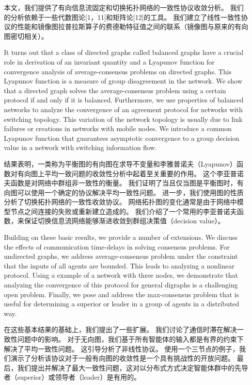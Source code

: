 \documentclass{article}
\begin{document}
本文，我们提供了有向信息流固定和切换拓扑网络的一致性协议收敛分析。
我们的分析依赖于一些代数图论[1，11]和矩阵论[12]的工具。
我们建立了线性一致性协议的性能和镜像图拉普拉斯算子的费德勒特征值之间的联系（镜像图与原来的有向图密切相关）。

{\color[gray]{0.5}
It turns out that a class of directed graphs called balanced graphs have a crucial role in derivation of an invariant quantity and a Lyapunov function for convergence analysis of average-consensus problems on directed graphs. 
This Lyapunov function is a measure of group disagreement in the network. 
We show that a directed graph solves the average-consensus problem using a certain protocol if and only if it is balanced. 
Furthermore, we use properties of balanced networks to analyze the convergence of an agreement protocol for networks with switching topology. 
This variation of the network topology is usually due to link failures or creations in networks with mobile nodes. 
We introduce a common Lyapunov function that guarantees asymptotic convergence to a group decision value in a network with switching information ﬂow.
}

结果表明，一类称为平衡图的有向图在求导不变量和李雅普诺夫（Lyapunov）函数对有向图上平均一致问题的收敛性分析中起着至关重要的作用。
这个李亚普诺夫函数是对网络中群组非一致性的衡量。
我们证明了当且仅当图是平衡图时，有向图可以使用一个确定的协议解决平均一致性问题。
进一步，我们使用图的性质分析了切换拓扑网络的一致性收敛协议。
网络拓扑图的变化通常是由于网络中模型节点之间连接的失败或重新建立造成的。
我们介绍了一个常用的李亚普诺夫函数，来保证切换信息流网络能够渐进收敛到群组决策值（decision value）。

{\color[gray]{0.5}
Building on these basic results, we provide a number of extensions. 
We discuss the eﬀects of communication time-delays in solving consensus problems. 
For undirected graphs, we address average-consensus problem under the constraint that the inputs of all agents are bounded. 
This leads to analyzing a nonlinear protocol. 
Using a example of a network with three nodes, we demonstrate that analyzing the convergence of this protocol for general digraphs is a challenging open problem. 
Finally, we pose and address the max-consensus problem that is useful for determining a superior or leader in a group of agents in a distributed way.
}

在这些基本结果的基础上，我们提出了一些扩展。
我们讨论了通信时滞在解决一致性问题中的影响。
对于无向图，我们基于所有智能体的输入都是有界的约束下解决了平均一致性问题。
这引导分析了非线性协议。
使用一个三节点的例子，我们演示了分析该协议对于一般有向图的收敛性是一个具有挑战性的开放问题。
最后，我们提出并解决了最大一致性问题，这对以分布式方式决定智能体群中的先导者（superior）或领导者（leader）是有用的。
\end{document}
